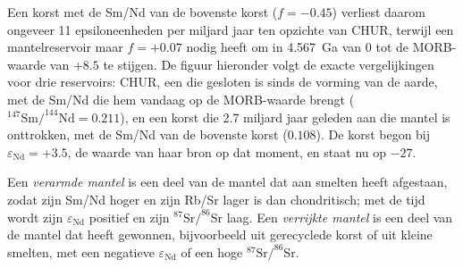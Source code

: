 Een korst met de Sm/Nd van de bovenste korst ($f = -0.45$) verliest daarom ongeveer
11 epsiloneenheden per miljard jaar ten opzichte van CHUR, terwijl een mantelreservoir
maar $f = +0.07$ nodig heeft om in \qty{4.567}{Ga} van 0 tot de MORB-waarde van $+8.5$
te stijgen. De figuur hieronder volgt de exacte vergelijkingen voor drie
reservoirs: CHUR, een  die gesloten is sinds de vorming van de aarde, met de Sm/Nd
die hem vandaag op de MORB-waarde brengt ($^{147}\mathrm{Sm}/^{144}\mathrm{Nd} =
0.211$), en een korst die 2.7 miljard jaar geleden aan die mantel is onttrokken, met de
Sm/Nd van de bovenste korst ($0.108$). De korst begon bij $\varepsilon_{\mathrm{Nd}} =
+3.5$, de waarde van haar bron op dat moment, en staat nu op $-27$.

\begin{definition}\label{def:b2:isotope-geochemistry:reservoirs}
Een \emph{verarmde mantel} is een deel van de mantel dat
 aan smelten heeft afgestaan, zodat zijn Sm/Nd hoger en zijn Rb/Sr
lager is dan chondritisch; met de tijd wordt zijn $\varepsilon_{\mathrm{Nd}}$ positief en
zijn $^{87}\mathrm{Sr}/^{86}\mathrm{Sr}$ laag. Een \emph{verrijkte
mantel} is een deel van de mantel dat
 heeft gewonnen, bijvoorbeeld uit gerecyclede korst of uit kleine smelten,
met een negatieve $\varepsilon_{\mathrm{Nd}}$ of een hoge $^{87}\mathrm{Sr}/^{86}\mathrm{Sr}$.
\end{definition}

